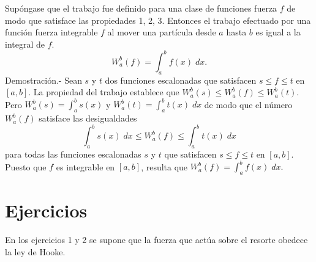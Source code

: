 \begin{teo}
    Supóngase que el trabajo fue definido para una clase de funciones fuerza $f$ de modo que satisface las propiedades 1, 2, 3. Entonces el trabajo efectuado por una función fuerza integrable $f$ al mover una partícula desde $a$ hasta $b$ es igual a la integral de $f$.
    $$W_a^b (f) = \int_a^b f(x)\; dx.$$
    Demostración.-\; Sean $s$ y $t$ dos funciones escalonadas que satisfacen $s\leq f\leq t$ en $[a,b]$. La propiedad del trabajo establece que $W_a^b (s) \leq W_a^b(f) \leq W_a^b (t)$. Pero $W_a^b (s) = \int_a^b s(x)$ y $W_a^b (t) = \int_a^b t(x) \;dx $ de modo que el número $W_a^b (f)$ satisface las desigualdades
    $$\int_a^b s(x)\; dx \leq W_a^b (f) \leq \int_a^b t(x)\; dx$$
    para todas las funciones escalonadas $s$ y $t$ que satisfacen $s\leq f\leq t$ en $[a,b]$. Puesto que $f$ es integrable en $[a,b]$, resulta que $W_a^b (f) = \int_a^b f(x)\; dx.$
\end{teo}


\section{Ejercicios}
En los ejercicios 1 y 2 se supone que la fuerza que actúa sobre el resorte obedece la ley de Hooke.\\\\

